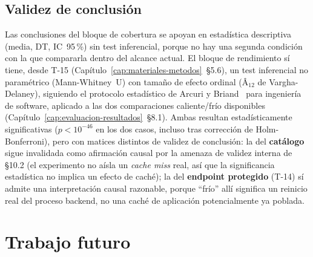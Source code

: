 \section{Validez de conclusión}

Las conclusiones del bloque de cobertura se apoyan en estadística
descriptiva (media, DT, IC~95\,\%) sin test inferencial, porque no hay
una segunda condición con la que compararla dentro del alcance actual.
El bloque de rendimiento sí tiene, desde T-15
(Capítulo~\ref{cap:materiales-metodos}~\S5.6), un test inferencial no
paramétrico (Mann-Whitney~U) con tamaño de efecto ordinal (Â$_{12}$ de
Vargha-Delaney), siguiendo el protocolo estadístico de Arcuri y
Briand~\cite{ARCURI2011} para ingeniería de software, aplicado a las dos
comparaciones caliente/frío disponibles (Capítulo~\ref{cap:evaluacion-resultados}~\S8.1).
Ambas resultan estadísticamente significativas ($p<10^{-46}$ en los dos
casos, incluso tras corrección de Holm-Bonferroni), pero con matices
distintos de validez de conclusión: la del \textbf{catálogo} sigue
invalidada como afirmación causal por la amenaza de validez interna de
\S10.2 (el experimento no aísla un \emph{cache miss} real, así que la
significancia estadística no implica un efecto de caché); la del
\textbf{endpoint protegido} (T-14) sí admite una interpretación causal
razonable, porque ``frío'' allí significa un reinicio real del proceso
backend, no una caché de aplicación potencialmente ya poblada.

\chapter{Trabajo futuro}
\label{cap:trabajo-futuro}

